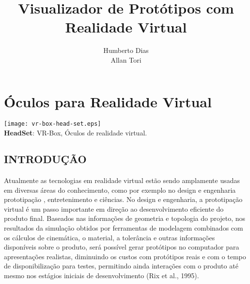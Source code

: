 \documentclass[12pt,a4paper]{article}
\title{Visualizador de Protótipos com Realidade Virtual}
\author{Humberto Dias
\\Allan Tori}
\begin{document}
\maketitle


\singlespacing
 
 
\section{Óculos para Realidade Virtual}

\begin{center}

\texttt{[image: vr-box-head-set.eps]} \\ [1em]
\textbf{HeadSet}: VR-Box, Óculos de realidade virtual.\cite{vr_vbox_head_set}

\end{center}

 
\subsection{INTRODUÇÃO}

\paragraph{}
Atualmente as tecnologias em realidade virtual estão sendo amplamente usadas em diversas áreas do conhecimento, 
como por exemplo no design e engenharia prototipação \cite{wiki:prototipacao}, entretenimento e ciências.
No design e engenharia, a prototipação virtual é um passo importante em direção
ao desenvolvimento eficiente do produto final.
Baseados nas informações de geometria e topologia do
projeto, nos resultados da simulação obtidos por
ferramentas de modelagem combinados com os cálculos
de cinemática, o material, a tolerância e outras
informações disponíveis sobre o produto, será possível
gerar protótipos no computador para apresentações
realistas, diminuindo os custos com protótipos reais e
com o tempo de disponibilização para testes, permitindo
ainda interações com o produto até mesmo nos estágios
iniciais de desenvolvimento (Rix et al., 1995).
\end{document}
